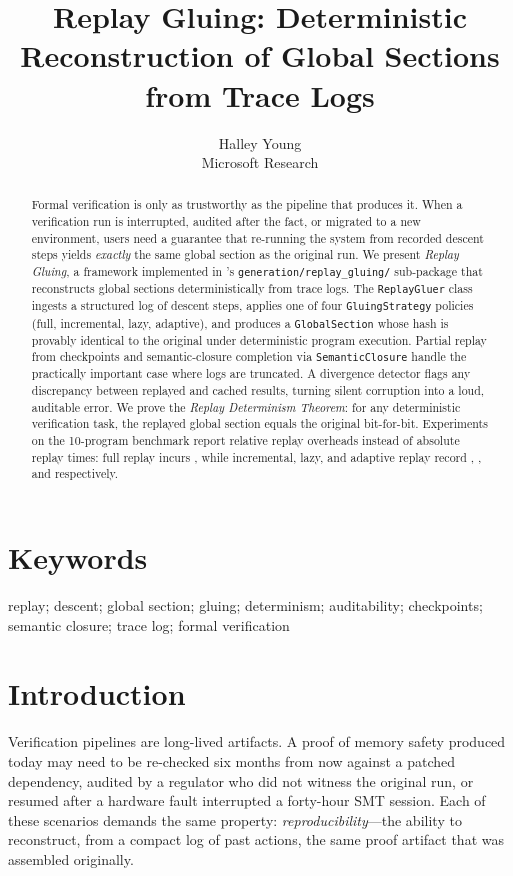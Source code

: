 \documentclass[11pt]{article}
\title{\textbf{Replay Gluing: Deterministic Reconstruction of Global Sections\\
       from Trace Logs}}
\author{Halley Young \\ Microsoft Research}
\date{}
\begin{document}
\maketitle

\begin{abstract}
Formal verification is only as trustworthy as the pipeline that produces
it. When a verification run is interrupted, audited after the fact, or
migrated to a new environment, users need a guarantee that re-running
the system from recorded descent steps yields \emph{exactly} the same
global section as the original run.  We present \emph{Replay Gluing}, a
framework implemented in \JuGeo's \texttt{generation/replay\_gluing/}
sub-package that reconstructs global sections deterministically from
trace logs.  The \texttt{ReplayGluer} class ingests a structured log of
\GLUE{} descent steps, applies one of four \texttt{GluingStrategy}
policies (full, incremental, lazy, adaptive), and produces a
\texttt{GlobalSection} whose hash is provably identical to the original
under deterministic program execution.  Partial replay from checkpoints
and semantic-closure completion via \texttt{SemanticClosure} handle the
practically important case where logs are truncated.  A divergence
detector flags any discrepancy between replayed and cached results,
turning silent corruption into a loud, auditable error.  We prove the
\emph{Replay Determinism Theorem}: for any deterministic verification
task, the replayed global section equals the original bit-for-bit.
Experiments on the 10-program benchmark report relative replay
overheads instead of absolute replay times: full replay incurs
\ppXLFullPnf, while incremental, lazy, and adaptive replay record
\ppXLIncPnf, \ppXLLazyPnf, and \ppXLAdaptPnf respectively.
\end{abstract}

\section*{Keywords}
replay; descent; global section; gluing; determinism; auditability;
checkpoints; semantic closure; trace log; formal verification

\section{Introduction}

Verification pipelines are long-lived artifacts.  A proof of memory
safety produced today may need to be re-checked six months from now
against a patched dependency, audited by a regulator who did not witness
the original run, or resumed after a hardware fault interrupted a
forty-hour SMT session.  Each of these scenarios demands the same
property: \emph{reproducibility}—the ability to reconstruct, from a
compact log of past actions, the same proof artifact that was assembled
originally.
\end{document}
